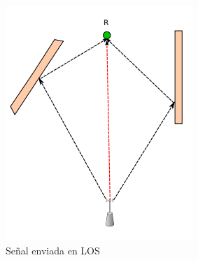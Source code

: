 \begin{enumerate}
{        \begin{figure}[h!]
            \centering
            \begin{subfigure}[b]{0.3\textwidth}
               \includegraphics[width=\textwidth]{./images/los}
                \caption{Señal enviada en \ac{LOS}}
                \label{fig:LOS}
            \end{subfigure}
            \begin{subfigure}[b]{0.315\textwidth}

\end{subfigure}
\end{figure}}
\end{enumerate}
